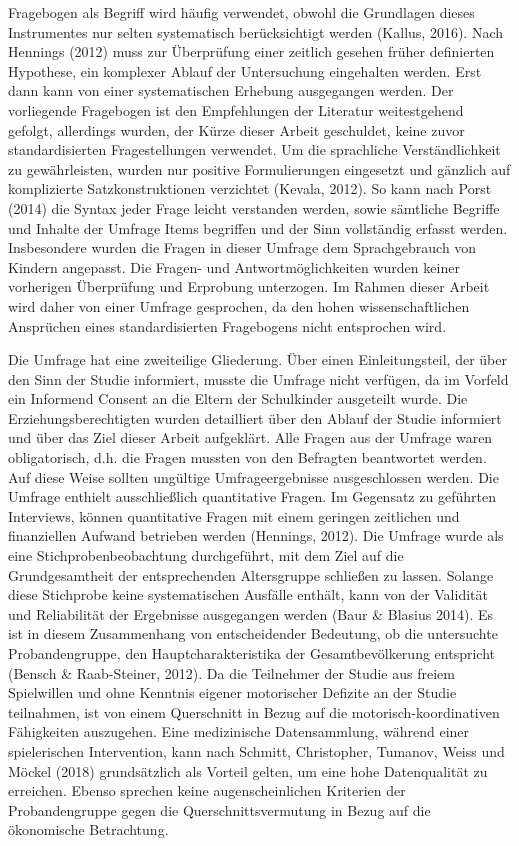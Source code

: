 \documentclass[
  a4paper,
  DIV=11,
  numbers=noendperiod,
  onecolumn,
  oneside,
  a4paper]{scrartcl}
\begin{document}
Fragebogen als Begriff wird häufig verwendet, obwohl die Grundlagen
dieses Instrumentes nur selten systematisch berücksichtigt werden
(Kallus, 2016). Nach Hennings (2012) muss zur Überprüfung einer zeitlich
gesehen früher definierten Hypothese, ein komplexer Ablauf der
Untersuchung eingehalten werden. Erst dann kann von einer systematischen
Erhebung ausgegangen werden. Der vorliegende Fragebogen ist den
Empfehlungen der Literatur weitestgehend gefolgt, allerdings wurden, der
Kürze dieser Arbeit geschuldet, keine zuvor standardisierten
Fragestellungen verwendet. Um die sprachliche Verständlichkeit zu
gewährleisten, wurden nur positive Formulierungen eingesetzt und
gänzlich auf komplizierte Satzkonstruktionen verzichtet (Kevala, 2012).
So kann nach Porst (2014) die Syntax jeder Frage leicht verstanden
werden, sowie sämtliche Begriffe und Inhalte der Umfrage Items begriffen
und der Sinn vollständig erfasst werden. Insbesondere wurden die Fragen
in dieser Umfrage dem Sprachgebrauch von Kindern angepasst. Die Fragen-
und Antwortmöglichkeiten wurden keiner vorherigen Überprüfung und
Erprobung unterzogen. Im Rahmen dieser Arbeit wird daher von einer
Umfrage gesprochen, da den hohen wissenschaftlichen Ansprüchen eines
standardisierten Fragebogens nicht entsprochen wird.

Die Umfrage hat eine zweiteilige Gliederung. Über einen Einleitungsteil,
der über den Sinn der Studie informiert, musste die Umfrage nicht
verfügen, da im Vorfeld ein Informend Consent an die Eltern der
Schulkinder ausgeteilt wurde. Die Erziehungsberechtigten wurden
detailliert über den Ablauf der Studie informiert und über das Ziel
dieser Arbeit aufgeklärt. Alle Fragen aus der Umfrage waren
obligatorisch, d.h. die Fragen mussten von den Befragten beantwortet
werden. Auf diese Weise sollten ungültige Umfrageergebnisse
ausgeschlossen werden. Die Umfrage enthielt ausschließlich quantitative
Fragen. Im Gegensatz zu geführten Interviews, können quantitative Fragen
mit einem geringen zeitlichen und finanziellen Aufwand betrieben werden
(Hennings, 2012). Die Umfrage wurde als eine Stichprobenbeobachtung
durchgeführt, mit dem Ziel auf die Grundgesamtheit der entsprechenden
Altersgruppe schließen zu lassen. Solange diese Stichprobe keine
systematischen Ausfälle enthält, kann von der Validität und Reliabilität
der Ergebnisse ausgegangen werden (Baur \& Blasius 2014). Es ist in
diesem Zusammenhang von entscheidender Bedeutung, ob die untersuchte
Probandengruppe, den Hauptcharakteristika der Gesamtbevölkerung
entspricht (Bensch \& Raab-Steiner, 2012). Da die Teilnehmer der Studie
aus freiem Spielwillen und ohne Kenntnis eigener motorischer Defizite an
der Studie teilnahmen, ist von einem Querschnitt in Bezug auf die
motorisch-koordinativen Fähigkeiten auszugehen. Eine medizinische
Datensammlung, während einer spielerischen Intervention, kann nach
Schmitt, Christopher, Tumanov, Weiss und Möckel (2018) grundsätzlich als
Vorteil gelten, um eine hohe Datenqualität zu erreichen. Ebenso sprechen
keine augenscheinlichen Kriterien der Probandengruppe gegen die
Querschnittsvermutung in Bezug auf die ökonomische Betrachtung.
\end{document}
